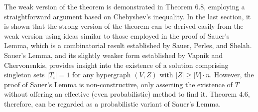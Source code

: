\documentclass[11pt,a4paper]{article}
\begin{document}
The weak version of the theorem is demonstrated in Theorem 6.8, employing a straightforward argument based on Chebyshev's inequality. In the last section, it is shown that the strong version of the theorem can be derived easily from the weak version using ideas similar to those employed in the proof of Sauer's Lemma, which is a combinatorial result established by Sauer, Perles, and Shelah. Sauer's Lemma, and its slightly weaker form established by Vapnik and Chervonenkis, provides insight into the existence of a solution comprising singleton sets $\lvert T_i \rvert = 1$ for any hypergraph $(V, Z)$ with $\lvert Z \rvert \ge \lvert V \rvert \cdot n$. However, the proof of Sauer's Lemma is non-constructive, only asserting the existence of $T$ without offering an effective (even probabilistic) method to find it. Theorem 4.6, therefore, can be regarded as a probabilistic variant of Sauer's Lemma.





\end{document}
